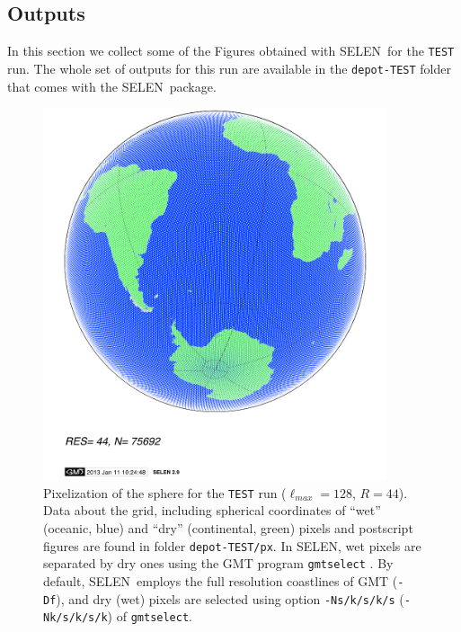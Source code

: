 \documentclass[11pt,fleqn,a4paper,titlepage]{article}
\newcommand\selen{\textsf{SELEN~}}
\newcommand\selens{\textsf{SELEN}}
\begin{document}
\newpage


\subsection{Outputs}\label{sec:outputs-test-run}

In this section we collect some of the Figures obtained with \selen for the \texttt{TEST} run. 
The whole set of outputs for this run are available in the \texttt{depot-TEST} folder that comes with 
the \selen package. 
\vspace{1cm}
\begin{figure}[!hbp] 
\begin{center}
\includegraphics[angle=0,width=0.9\textwidth]{./Figures/px-sphere.png}
\vspace{0cm}
\caption[Tegmark icosahedral pixelization]{\small{Pixelization of the sphere for the \texttt{TEST} run ($\ell_{max}=128$, $R=44$). Data about the grid, including spherical coordinates of ``wet'' (oceanic, blue) and  ``dry'' (continental, green) pixels and postscript figures are found in folder \texttt{depot-TEST/px}. In \selens, wet pixels are separated by dry ones using the GMT program \texttt{gmtselect} \citep{Wessel_and_Smith_1998}. By default, \selen employs the full resolution coastlines of GMT (\texttt{-Df}), and dry (wet) pixels are selected using option \texttt{-Ns/k/s/k/s} (\texttt{-Nk/s/k/s/k}) of \texttt{gmtselect}}.}
\label{fig:pixelization} 
\end{center} 
\end{figure}
\newpage
\end{document}
